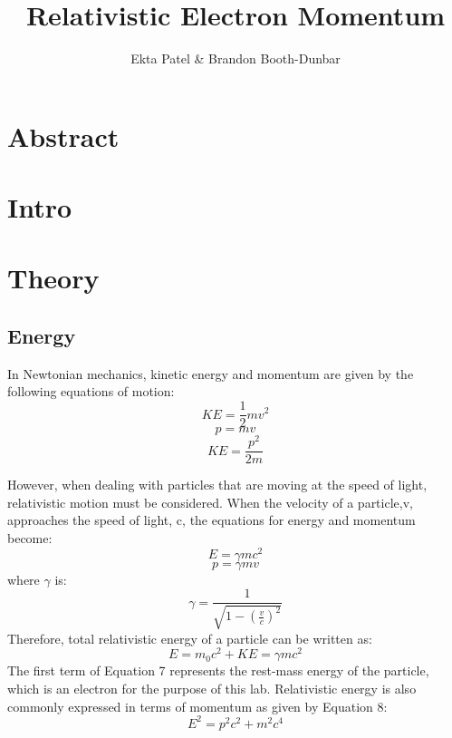 


\newcommand{\ig}[2][width=4in]{\texttt{[image: \#2]}}    		
\usepackage{graphicx}					
\usepackage{amssymb}
\usepackage{pgfplotstable}
\usepackage{float}


\header {\today}							
\title{Relativistic Electron Momentum}
\author{Ekta Patel \& Brandon Booth-Dunbar}



\section{Abstract}
\begin{em}
\end{em}

\section{Intro}

\section{Theory}

\subsection{Energy}
In Newtonian mechanics, kinetic energy and momentum are given by the following equations of motion:
\begin{equation}KE= \frac{1}{2}mv^2 \end{equation}
\begin{equation} p=mv \end{equation}
\begin {equation}KE=\frac{p^2}{2m} \end{equation}

However, when dealing with particles that are moving at the speed of light, relativistic motion must be considered. When the velocity of a particle,v, approaches the speed of light, c, the equations for energy and momentum become:
\begin{equation} E=\gamma mc^2\end{equation}
\begin{equation} p=\gamma mv\end{equation}
where $\gamma$ is:
\begin{equation} \gamma= \frac{1}{\sqrt{1-(\frac{v}{c})^2}}\end{equation}
Therefore, total relativistic energy of a particle can be written as:
\begin{equation} E=m_0c^2+KE=\gamma mc^2\end{equation}
The first term of Equation 7 represents the rest-mass energy of the particle, which is an electron for the purpose of this lab. Relativistic energy is also commonly expressed in terms of momentum as given by Equation 8:
\begin{equation}E^2=p^2c^2+m^2c^4\end{equation}
